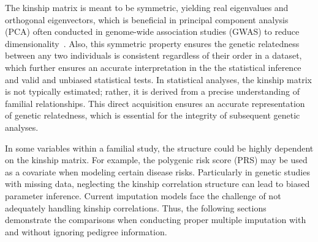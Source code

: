The kinship matrix is meant to be symmetric, yielding real eigenvalues and orthogonal eigenvectors, which is beneficial in principal component analysis (PCA) often conducted in genome-wide association studies (GWAS) to reduce dimensionality~\cite{price2006principal}.
Also, this symmetric property ensures the genetic relatedness between any two individuals is consistent regardless of their order in a dataset, which further ensures an accurate interpretation in the the statistical inference and valid and unbiased statistical tests. 
In statistical analyses, the kinship matrix is not typically estimated; rather, it is derived from a precise understanding of familial relationships. 
This direct acquisition ensures an accurate representation of genetic relatedness, which is essential for the integrity of subsequent genetic analyses.

In some variables within a familial study, the structure could be highly dependent on the kinship matrix. 
For example, the polygenic risk score (PRS) may be used as a covariate when modeling certain disease risks.
Particularly in genetic studies with missing data, neglecting the kinship correlation structure can lead to biased parameter inference.
Current imputation models face the challenge of not adequately handling kinship correlations.
Thus, the following sections demonstrate the comparisons when conducting proper multiple imputation with and without ignoring pedigree information.

